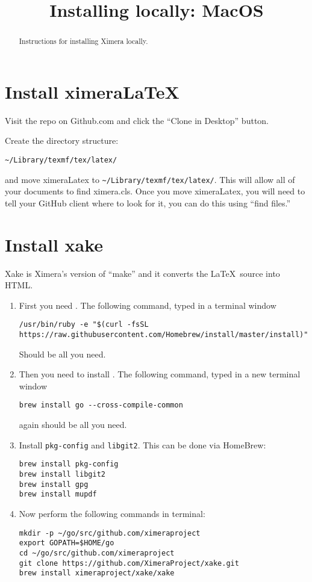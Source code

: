 \documentclass{ximera}
\title{Installing locally: MacOS}
\begin{document}
\begin{abstract}
Instructions for installing Ximera locally.
\end{abstract}
\maketitle


\section{Install ximeraLaTeX}


Visit the repo on Github.com  and click the
``Clone in Desktop'' button.


Create the directory structure:

\begin{verbatim}
~/Library/texmf/tex/latex/
\end{verbatim}

and move ximeraLatex to \verb|~/Library/texmf/tex/latex/|. This will allow
all of your documents to find ximera.cls. Once you move ximeraLatex,
you will need to tell your GitHub client where to look for it, you can
do this using ``find files.''





\section{Install xake}

Xake is Ximera's version of ``make'' and it converts the
\LaTeX\ source into HTML.

\begin{enumerate}
\item First you need . The following command, typed in a terminal window
\begin{verbatim}
/usr/bin/ruby -e "$(curl -fsSL https://raw.githubusercontent.com/Homebrew/install/master/install)"
\end{verbatim}
Should be all you need. 
\item Then you need to install . The following command, typed in a new terminal window
\begin{verbatim}
brew install go --cross-compile-common
\end{verbatim}
again should be all you need.
\item Install \verb|pkg-config| and \verb|libgit2|. This can be done via HomeBrew:
\begin{verbatim}
brew install pkg-config
brew install libgit2
brew install gpg
brew install mupdf
\end{verbatim}
\item Now perform the following commands in terminal:
\begin{verbatim}
mkdir -p ~/go/src/github.com/ximeraproject
export GOPATH=$HOME/go
cd ~/go/src/github.com/ximeraproject
git clone https://github.com/XimeraProject/xake.git
brew install ximeraproject/xake/xake
\end{verbatim}
\end{enumerate}
\end{document}
